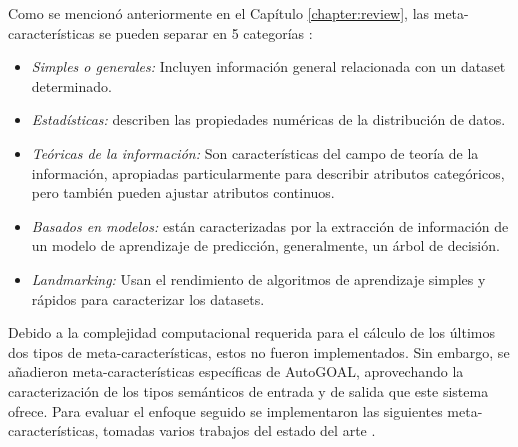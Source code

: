 
Como se mencionó anteriormente en el Capítulo \ref{chapter:review}, las meta-características se pueden separar en 5 categorías \cite{bradzil2009metalearning}:

\begin{itemize}
	\item \textit{Simples o generales:} Incluyen información general relacionada con un dataset determinado.
	\item \textit{Estadísticas:} describen las propiedades numéricas de la distribución de datos. %
	\item \textit{Teóricas de la información:} Son características del campo de teoría de la información, apropiadas particularmente para describir atributos categóricos, pero también pueden ajustar atributos continuos. %
	\item \textit{Basados en modelos:} están caracterizadas por la extracción de información de un modelo de aprendizaje de predicción, generalmente, un árbol de decisión.
	\item \textit{Landmarking:} Usan el rendimiento de algoritmos de aprendizaje simples y rápidos para caracterizar los datasets.
\end{itemize}

Debido a la complejidad computacional requerida para el cálculo de los últimos dos tipos de meta-características, estos no fueron implementados. Sin embargo, se añadieron meta-características específicas de AutoGOAL, aprovechando la caracterización de los tipos semánticos de entrada y de salida que este sistema ofrece. Para evaluar el enfoque seguido se implementaron las siguientes meta-características, tomadas varios trabajos del estado del arte \cite{castiello2005metadata, fuerer2015efficient}.

